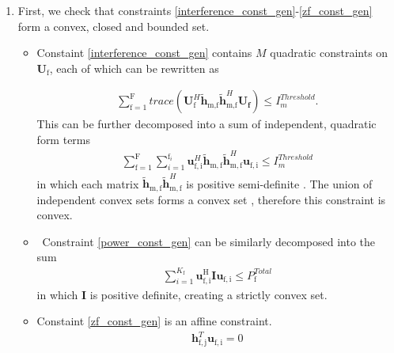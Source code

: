 \documentclass[12pt,a4paper]{report}
\begin{document}
\begin{enumerate}
\item
First, we check that constraints \eqref{interference_const_gen}-\eqref{zf_const_gen} form a convex, closed and bounded set. 

\begin{itemize}

\item
	Constaint \eqref{interference_const_gen} contains $M$ quadratic constraints on $\mathbf{U}_\text{f}$, each of which 
	can be rewritten  as

\begin{gather*}
	\sum_{\text{f}=1}^{\text{F}}
	trace(\mathbf{U}_{\text{f}}^H \mathbf{\tilde{h}}_{\text{m,f}} \mathbf{\tilde{h}}_{\text{m,f}}^H \mathbf{U_f} )\leq 
	I^{Threshold}_{m}.
\end{gather*}
This can be further decomposed into a sum of independent, quadratic form terms
	\begin{gather*}
	\sum_{\text{f}=1}^{\text{F}}
	\sum_{i=1}^{\text{f}_i}
	\mathbf{u}_{\mathrm{f,i}}^H\mathbf{\tilde{h}}_{\mathrm{m,f}} \mathbf{\tilde{h}}_{\mathrm{m,f}}^H
	\mathbf{u}_{\mathrm{f,i}} \leq I^{Threshold}_{m}
	\end{gather*}
in which each matrix $\mathbf{\tilde{h}_{\mathrm{m,f}}} \mathbf{\tilde{h}}_{\mathrm{m,f}}^H$ is positive semi-definite \cite[p.~8,9]{BoV:04}. The union of independent convex sets forms a convex set \cite{BoV:04}, therefore this constraint is convex. 

\item \
	Constraint \eqref{power_const_gen} can be similarly decomposed into the sum
	\begin{gather*}
		\sum_{i=1}^{K_{\text{f}}}\mathbf{u_{\mathrm{f,i}}^{\mathrm{H}}} \mathbf{I} 		
		\mathbf{u_{\mathrm{f,i}}} \leq  P^{Total}_{\text{f}}
	\end{gather*}
	in which $\mathbf{I}$ is positive definite, creating a strictly convex set.

\item 
	Constaint \eqref{zf_const_gen} is an affine constraint. 
		\begin{gather*}
		\mathbf{h}_{\mathrm{f,j}}^T \mathbf{u}_{\mathrm{f,i}} =0
		\end{gather*}
\end{itemize}



\end{enumerate}
\end{document}

